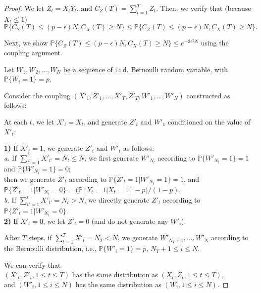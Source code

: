 \begin{proof}
We let $Z_t = X_t Y_t$, and $C_Z(T) = \sum_{t=1}^T Z_t$. Then, we verify that (because $X_t \leq 1$)
\begin{equation}
\mathbb{P}\{C_Y(T) \leq (p-\epsilon) N, C_X(T) \geq N \} \leq \mathbb{P}\{C_Z(T) \leq (p-\epsilon) N, C_X(T) \geq N \}.
\end{equation}

Next, we show $\mathbb{P}\{C_Z(T) \leq (p-\epsilon) N, C_X(T) \geq N \} \leq e^{-2 \epsilon^2 N}$  using the coupling argument.

Let $W_1, W_2, \ldots, W_N$ be a sequence of i.i.d. Bernoulli random variable, with $\mathbb{P}\{W_i = 1\} = p$. 

Consider the coupling  $(X'_1, Z'_1,  \ldots, X'_T, Z'_T, W'_1, \ldots, W'_N)$ constructed as follows:

At each $t$, we let $X'_t = X_t$, and generate $Z'_t$ and $W'_1$ conditioned on the value of $X'_t$:

\textbf{1)} If $X'_t = 1$, we generate $Z'_t$ and $W'_i$ as follows: \\
{\it a.} If $\sum_{t' = 1}^t X'_{t'} = N_t \leq N$,  we first generate $W'_{N_t}$ according to $\mathbb{P}\{W'_{N_t} = 1\} = 1$ and $\mathbb{P}\{W'_{N_t} = 1\} = 0$; \\
then we generate $Z'_t$ according to $\mathbb{P}\{Z'_t = 1 | W'_{N_t} = 1\} = 1$, and $\mathbb{P}\{Z'_t = 1 | W'_{N_t} = 0\} = \big(\mathbb{P}[Y_t = 1| X_t = 1]-p)/(1-p)$. \\
{\it b.} If $\sum_{t' = 1}^t X'_{t'} = N_t > N$, we directly generate $Z'_t$ according to $\mathbb{P}\{Z'_t = 1 | W'_{N_t} = 0\}$.\\

\textbf{2)} If $X'_t = 0$, we let $Z'_t = 0$ (and do not generate any $W'_i$).

After $T$ steps, if  $\sum_{t = 1}^T X'_t = N_T < N$, we generate $W'_{N_T+1}, \ldots, W'_{N}$ according to the Bernoulli distribution, i.e., $\mathbb{P}\{W'_i = 1\} = p$, $N_T + 1\leq i \leq N$.

We can verify that \\
$(X'_t, Z'_t, 1\leq t \leq T)$ has the  same distribution as $(X_t, Z_t, 1\leq t \leq T)$, \\
and 
$(W'_i, 1\leq i \leq N)$ has the same distribution as $(W_i, 1\leq i\leq N)$.


\end{proof}
